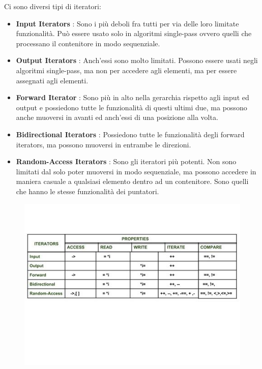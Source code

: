 \textsf{\small Ci sono diversi tipi di iteratori: } \\

\begin{itemize}
	\item \textsf{\small \textbf{Input Iterators} : Sono i più deboli fra tutti per via delle loro limitate funzionalità. Può essere usato solo in algoritmi single-pass ovvero quelli che processano il contenitore in modo sequenziale.}
	\item \textsf{\small \textbf{Output Iterators} : Anch'essi sono molto limitati. Possono essere usati negli algoritmi single-pass, ma non per accedere agli elementi, ma per essere assegnati agli elementi.}
	\item \textsf{\small \textbf{Forward Iterator} : Sono più in alto nella gerarchia rispetto agli input ed output e possiedono tutte le funzionalità di questi ultimi due, ma possono anche muoversi in avanti ed anch'essi di una posizione alla volta.}
	\item \textsf{\small \textbf{Bidirectional Iterators} : Possiedono tutte le funzionalità degli forward iterators, ma possono muoversi in entrambe le direzioni.}
	\item \textsf{\small \textbf{Random-Access Iterators} : Sono gli iteratori più potenti. Non sono limitati dal solo poter muoversi in modo sequenziale, ma possono accedere in maniera casuale a qualsiasi elemento dentro ad un contenitore. Sono quelli che hanno le stesse funzionalità dei puntatori.}
\end{itemize}

\pagebreak

\begin{figure}[H]
	\centering
	\includegraphics[width=1.2\textwidth, height=1.2\textheight, keepaspectratio]{./imgs/iterators.jpg}
	\label{fig:iterators}
\end{figure}

